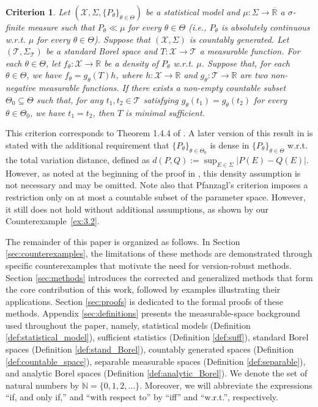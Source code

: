 \documentclass[12pt]{article}
\newtheorem{criterion}{Criterion}[section]
\begin{document}
\begin{criterion}
\label{crit:2.6}
Let $(\mathcal{X},\Sigma,\{P_\theta\}_{\theta\in\Theta })$ be a statistical model and $\mu :\Sigma\to\overline{\mathbb{R}}$ a $\sigma$-finite measure such that $P_\theta \ll \mu $ for every $\theta\in\Theta$ (i.e., $P_\theta$ is absolutely continuous w.r.t. $\mu $ for every $\theta\in \Theta$). Suppose that $(\mathcal{X},\Sigma )$ is countably generated. Let $(\mathcal{T},\Sigma _\mathcal{T})$ be a standard Borel space and $T:\mathcal{X}\to \mathcal{T}$ a measurable function. For each $\theta\in\Theta$, let $f_\theta :\mathcal{X}\to \mathbb{R}$ be a density of $P_\theta$ w.r.t. $\mu$. Suppose that, for each $\theta\in\Theta$, we have $f_\theta =g_\theta (T)h$, where $h:\mathcal{X}\to \mathbb{R}$ and $g_\theta :\mathcal{T}\to \mathbb{R}$ are two non-negative measurable functions. If there exists a non-empty countable subset $\Theta _0\subseteq\Theta$ such that, for any $t_1,t_2\in \mathcal{T}$ satisfying $g_\theta (t_1)=g_\theta (t_2)$ for every $\theta\in\Theta _0$, we have $t_1=t_2$, then $T$ is minimal sufficient.
\end{criterion}
This criterion corresponds to Theorem 1.4.4 of \cite{Pfanzagl1994}. A later version of this result in \cite{Pfanzagl2017} is stated with the additional requirement that $\{P_{\theta }\}_{\theta\in\Theta _0}$ is dense in $\{P_\theta \}_{\theta\in \Theta }$ w.r.t. the total variation distance, defined as $d(P,Q):=\sup _{E\in \Sigma }|P(E)-Q(E)|$. However, as noted at the beginning of the proof in \cite{Pfanzagl1994}, this density assumption is not necessary and may be omitted. Note also that Pfanzagl's criterion imposes a restriction only on at most a countable subset of the parameter space. However, it still does not hold without additional assumptions, as shown by our Counterexample~\ref{ex:3.2}. 

The remainder of this paper is organized as follows. In Section \ref{sec:counterexamples}, the limitations of these methods are demonstrated through specific counterexamples that motivate the need for version-robust methods. Section \ref{sec:methods} introduces the corrected and generalized methods that form the core contribution of this work, followed by examples illustrating their applications. Section \ref{sec:proofs} is dedicated to the formal proofs of these methods.  Appendix \ref{sec:definitions} presents the measurable-space background used throughout the paper, namely, statistical models (Definition \ref{def:statistical_model}), sufficient statistics (Definition \ref{def:suff}), standard Borel spaces (Definition \ref{def:stand_Borel}), countably generated spaces (Definition \ref{def:countable_space}), separable measurable spaces (Definition \ref{def:separable}), and analytic Borel spaces (Definition \ref{def:analytic_Borel}). We denote the set of natural numbers by $\mathbb{N} = \{0,1,2, \ldots \}$. Moreover, we will abbreviate the expressions ``if, and only if,'' and ``with respect to'' by ``iff'' and ``w.r.t.'', respectively.
\end{document}
